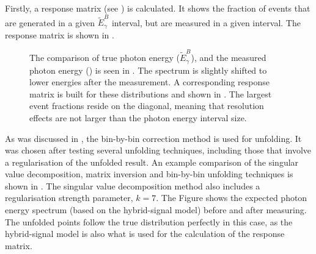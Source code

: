 Firstly, a response matrix (see ) is calculated.
It shows the fraction of events that are generated in a given $\tilde{E}_{\gamma}^B$ interval, but are measured in a given \EB interval.
The response matrix is shown in .

\begin{figure}[htbp!]
    \centering
    \caption{\label{fig:unfolding_setup} The comparison of true photon energy ($\tilde{E}_{\gamma}^B$),
    and the measured photon energy (\EB) is seen in .
    The spectrum is slightly shifted to lower energies after the measurement.
    A corresponding response matrix is built for these distributions and shown in .
    The largest \BtoXsgamma event fractions reside on the diagonal, meaning that resolution effects are not larger than the photon energy interval size.
    }
\end{figure}

As was discussed in , the bin-by-bin correction method is used for unfolding.
It was chosen after testing several unfolding techniques, including those that involve a regularisation of the unfolded result.
An example comparison of the singular value decomposition, matrix inversion and bin-by-bin unfolding techniques is shown in .
The singular value decomposition method also includes a regularisation strength parameter, $k=7$.
The Figure shows the expected \BtoXsgamma photon energy spectrum (based on the hybrid-signal model) before and after measuring.
The unfolded points follow the true distribution perfectly in this case, as the hybrid-signal model is also what is used for the calculation of the response matrix.

